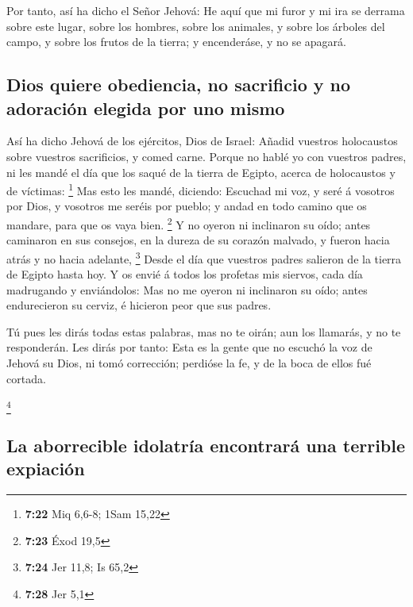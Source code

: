  Por tanto, así ha dicho el Señor Jehová: He aquí que mi
furor y mi ira se derrama sobre este lugar, sobre los hombres, sobre los
animales, y sobre los árboles del campo, y sobre los frutos de la
tierra; y encenderáse, y no se apagará.

\hypertarget{dios-quiere-obediencia-no-sacrificio-y-no-adoraciuxf3n-elegida-por-uno-mismo}{%
\subsection{Dios quiere obediencia, no sacrificio y no adoración elegida
por uno
mismo}\label{dios-quiere-obediencia-no-sacrificio-y-no-adoraciuxf3n-elegida-por-uno-mismo}}

 Así ha dicho Jehová de los ejércitos, Dios de Israel:
Añadid vuestros holocaustos sobre vuestros sacrificios, y comed carne.
 Porque no hablé yo con vuestros padres, ni les mandé el
día que los saqué de la tierra de Egipto, acerca de holocaustos y de
víctimas: \footnote{\textbf{7:22} Miq 6,6-8; 1Sam 15,22} 
Mas esto les mandé, diciendo: Escuchad mi voz, y seré á vosotros por
Dios, y vosotros me seréis por pueblo; y andad en todo camino que os
mandare, para que os vaya bien. \footnote{\textbf{7:23} Éxod 19,5}
 Y no oyeron ni inclinaron su oído; antes caminaron en sus
consejos, en la dureza de su corazón malvado, y fueron hacia atrás y no
hacia adelante, \footnote{\textbf{7:24} Jer 11,8; Is 65,2} 
Desde el día que vuestros padres salieron de la tierra de Egipto hasta
hoy. Y os envié á todos los profetas mis siervos, cada día madrugando y
enviándolos:  Mas no me oyeron ni inclinaron su oído; antes
endurecieron su cerviz, é hicieron peor que sus padres.

 Tú pues les dirás todas estas palabras, mas no te oirán;
aun los llamarás, y no te responderán.  Les dirás por
tanto: Esta es la gente que no escuchó la voz de Jehová su Dios, ni tomó
corrección; perdióse la fe, y de la boca de ellos fué cortada.

\footnote{\textbf{7:28} Jer 5,1}

\hypertarget{la-aborrecible-idolatruxeda-encontraruxe1-una-terrible-expiaciuxf3n}{%
\subsection{La aborrecible idolatría encontrará una terrible
expiación}\label{la-aborrecible-idolatruxeda-encontraruxe1-una-terrible-expiaciuxf3n}}

